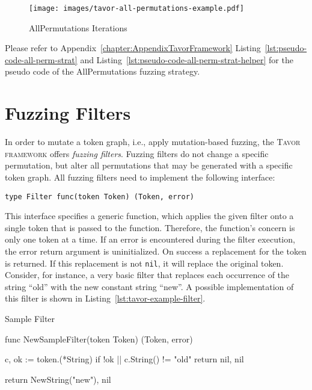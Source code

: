 \begin{figure}[ht]
\texttt{[image: images/tavor-all-permutations-example.pdf]}
\caption{AllPermutations Iterations}
\label{fig:all-perm-example}
\end{figure}

Please refer to Appendix~\ref{chapter:AppendixTavorFramework} Listing~\ref{lst:pseudo-code-all-perm-strat} and Listing~\ref{lst:pseudo-code-all-perm-strat-helper} for the pseudo code of the AllPermutations fuzzing strategy.

\section{Fuzzing Filters}
\label{sec:fuzzingFilters}

In order to mutate a token graph, i.e., apply mutation-based fuzzing, the \textsc{Tavor framework} offers \emph{fuzzing filters}. Fuzzing filters do not change a specific permutation, but alter all permutations that may be generated with a specific token graph. All fuzzing filters need to implement the following interface:

\begin{center} \texttt{type Filter func(token Token) (Token, error)} \end{center}

This interface specifies a generic function, which applies the given filter onto a single token that is passed to the function. Therefore, the function's concern is only one token at a time. If an error is encountered during the filter execution, the error return argument is uninitialized. On success a replacement for the token is returned. If this replacement is not \texttt{nil}, it will replace the original token. Consider, for instance, a very basic filter that replaces each occurrence of the string \enquote{old} with the new constant string \enquote{new}. A possible implementation of this filter is shown in Listing~\ref{lst:tavor-example-filter}.

\begin{listing}[ht]
\caption{Sample Filter}
\label{lst:tavor-example-filter}
\begin{gocode}
func NewSampleFilter(token Token) (Token, error) {
	c, ok := token.(*String)
	if !ok || c.String() != "old" {
		return nil, nil
	}

	return NewString("new"), nil
}
\end{gocode}
\end{listing}

